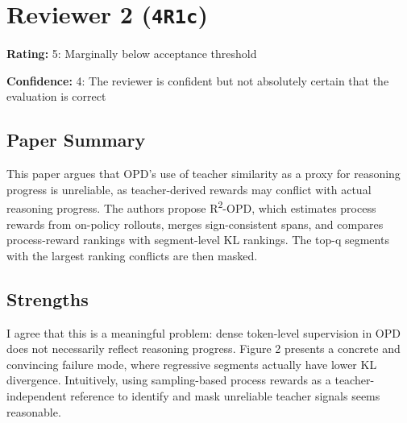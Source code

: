 \section{Reviewer 2 (\texttt{4R1c})}
\label{reviewer:2}
\noindent\textbf{Rating:} 5: Marginally below acceptance threshold\par
\noindent\textbf{Confidence:} 4: The reviewer is confident but not absolutely certain that the evaluation is correct

\subsection*{Paper Summary}
This paper argues that OPD's use of teacher similarity as a proxy for reasoning progress is unreliable, as teacher-derived rewards may conflict with actual reasoning progress. The authors propose R\textsuperscript{2}-OPD, which estimates process rewards from on-policy rollouts, merges sign-consistent spans, and compares process-reward rankings with segment-level KL rankings. The top-q segments with the largest ranking conflicts are then masked.

\subsection*{Strengths}
I agree that this is a meaningful problem: dense token-level supervision in OPD does not necessarily reflect reasoning progress. Figure 2 presents a concrete and convincing failure mode, where regressive segments actually have lower KL divergence. Intuitively, using sampling-based process rewards as a teacher-independent reference to identify and mask unreliable teacher signals seems reasonable.

